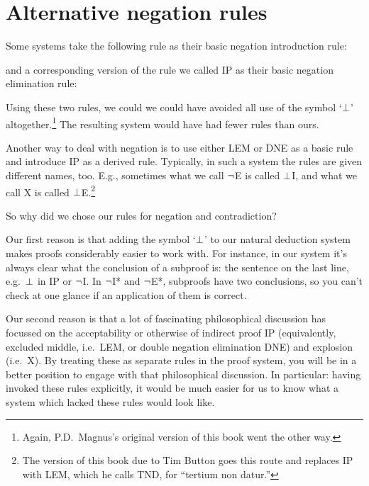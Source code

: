 \section{Alternative negation rules}
Some systems take the following rule as their basic negation introduction rule:
\begin{fitchproof}
	\open
	\close
\end{fitchproof}
and a corresponding version of the rule we called IP as their basic negation elimination rule:
\begin{fitchproof}
	\open
	\close
\end{fitchproof}
Using these two rules, we could we could have avoided all use of the symbol `$\bot$' altogether.\footnote{Again, P.D.\ Magnus's original version of this book went the other way.} The resulting system would have had fewer rules than ours.

Another way to deal with negation is to use either LEM or DNE as a basic rule and introduce IP as a derived rule. Typically, in such a system the rules are given different names, too. E.g., sometimes what we call $\neg$E is called $\bot$I, and what we call X is called $\bot$E.\footnote{The version of this book due to Tim Button goes this route and replaces IP with LEM, which he calls TND, for ``tertium non datur.''}

So why did we chose our rules for negation and contradiction? 

Our first reason is that adding the symbol `$\bot$' to our natural deduction system makes proofs considerably easier to work with. For instance, in our system it's always clear what the conclusion of a subproof is: the sentence on the last line, e.g.\ $\bot$ in IP or $\neg$I. In $\neg$I* and $\neg$E*, subproofs have two conclusions, so you can't check at one glance if an application of them is correct.

Our second reason is that a lot of fascinating philosophical discussion has focussed on the acceptability or otherwise of indirect proof IP (equivalently, excluded middle, i.e.\ LEM, or double negation elimination DNE) and explosion (i.e.\ X). By treating these as separate rules in the proof system, you will be  in a better position to engage with that philosophical discussion. In particular: having invoked these rules explicitly, it would be much easier for us to know what a system which lacked these rules would look like.

